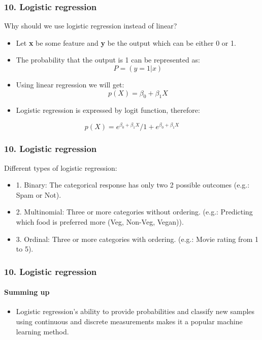 \documentclass[handout,compress]{beamer} %
\begin{document}
\begin{frame}[allowframebreaks]
\frametitle{10. Logistic regression}
Why should we use logistic regression instead of linear?
\begin{itemize}
\item
Let \textbf{x} be some feature and \textbf{y} be the output which can be either 0 or 1. 
\item
The probability that the output is 1 can be represented as:
\begin{equation}
P = (y=1 | x)
\end{equation}
\item
Using linear regression we will get:  
\begin{equation}
p(X) = \beta_{0} + \beta_{1}X
\end{equation}
\item
Logistic regression is expressed by logit function, therefore:
\end{itemize}
\begin{equation}
p(X) = {e^{\beta_{0} + \beta_{1}X}}/{1 + e^{\beta_{0} + \beta_{1}X}}
\end{equation}
\end{frame}

\begin{frame}[allowframebreaks]
\frametitle{10. Logistic regression}
Different types of logistic regression:
\begin{itemize}
	\item
	1. Binary: The categorical response has only two 2 possible outcomes (e.g.: Spam or Not).
	\item
	2. Multinomial: Three or more categories without ordering. (e.g.: Predicting which food is preferred more (Veg, Non-Veg, Vegan)).
	\item
	3. Ordinal: Three or more categories with ordering. (e.g.: Movie rating from 1 to 5).
\end{itemize}
\end{frame}
\begin{frame}[allowframebreaks]
\frametitle{10. Logistic regression}
\framesubtitle{Summing up}
\begin{itemize}
	\item
	Logistic regression's ability to provide probabilities and classify new samples using continuous and discrete measurements makes it a popular machine learning method.
\end{itemize}
\end{frame}
	 
\end{document}
